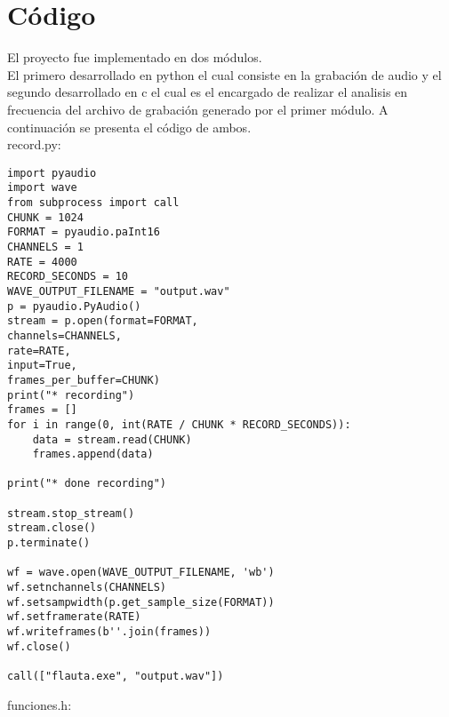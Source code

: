 \section{Código}
El proyecto fue implementado en dos módulos.\\ El primero desarrollado en python el cual consiste en la grabación de audio y el segundo desarrollado en c el cual es el encargado de realizar el analisis en frecuencia del archivo de grabación generado por el primer módulo. A continuación se presenta el código de ambos.\\
record.py:
\begin{lstlisting}[style=CStyle]
import pyaudio
import wave
from subprocess import call
CHUNK = 1024
FORMAT = pyaudio.paInt16
CHANNELS = 1
RATE = 4000
RECORD_SECONDS = 10
WAVE_OUTPUT_FILENAME = "output.wav"
p = pyaudio.PyAudio()
stream = p.open(format=FORMAT,
channels=CHANNELS,
rate=RATE,
input=True,
frames_per_buffer=CHUNK)
print("* recording")
frames = []
for i in range(0, int(RATE / CHUNK * RECORD_SECONDS)):
	data = stream.read(CHUNK)
	frames.append(data)

print("* done recording")

stream.stop_stream()
stream.close()
p.terminate()

wf = wave.open(WAVE_OUTPUT_FILENAME, 'wb')
wf.setnchannels(CHANNELS)
wf.setsampwidth(p.get_sample_size(FORMAT))
wf.setframerate(RATE)
wf.writeframes(b''.join(frames))
wf.close()

call(["flauta.exe", "output.wav"])

\end{lstlisting}
funciones.h:
